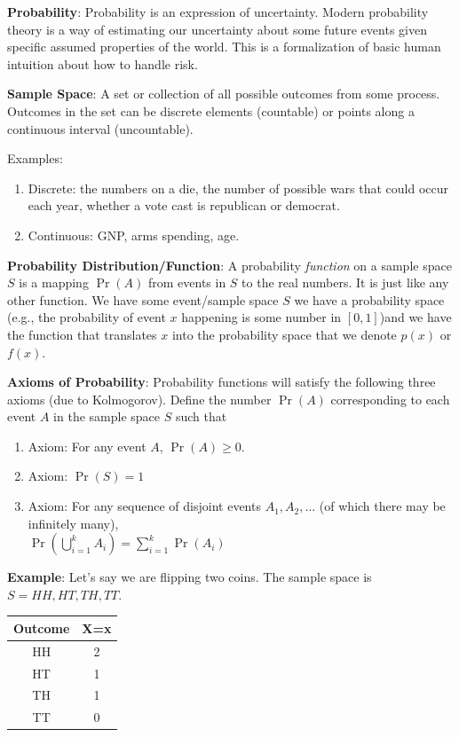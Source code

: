\documentclass[11pt]{article}
\newcommand{\be}{\begin{enumerate}}
\newcommand{\ee}{\end{enumerate}}
\begin{document}
\item {\bf Probability}: Probability is an expression of uncertainty.
  Modern probability theory is a way of estimating our uncertainty
  about some future events given specific assumed properties of the
  world.  This is a formalization of basic human intuition about how
  to handle risk.  

\item {\bf Sample Space}: A set or collection of all possible outcomes
  from some process.  Outcomes in the set can be discrete elements
  (countable) or points along a continuous interval (uncountable).
\item Examples:
  \be
  \item Discrete:  the numbers on a die, the number of possible wars
        that could occur each year, whether a vote cast is republican
    or democrat.
  \item Continuous: GNP, arms spending, age.
  \ee

\item {\bf Probability Distribution/Function}: A probability \textit{function} on a
  sample space $S$ is a mapping $\Pr(A)$ from events in $S$ to the
  real numbers.  It is just like any other function.  We have some
  event/sample space $S$ we have a probability space (e.g., the
  probability of event $x$ happening is some number in $[0,1]$)and we have the
  function that translates $x$ into the probability space that we
  denote $p(x)$ or $f(x)$.  

\item {\bf Axioms of Probability}: Probability functions will satisfy
  the following three axioms (due to Kolmogorov). Define the number
  $\Pr(A)$ corresponding to each event $A$ in the sample space $S$ such
  that \be
  \item Axiom:  For any event $A$, $\Pr(A)\ge 0$.
  \item Axiom:  $\Pr(S)=1$
  \item Axiom: For any sequence of disjoint events
    $A_1,A_2,\ldots$ (of which there may be infinitely many),\\
    $\Pr\left( \bigcup\limits_{i=1}^k A_i\right)=\sum\limits_{i=1}^k
    \Pr(A_i)$ \ee



\item {\bf Example}: Let's say we are flipping two coins.  The sample
  space is $S={HH, HT, TH, TT}$.  


\begin{center}
\begin{tabular}{c | c}
\hline
Outcome & X=x \\
\hline
HH & 2 \\
HT & 1 \\
TH & 1 \\
TT & 0 \\
\hline
\end{tabular}
\end{center}
\end{document}

